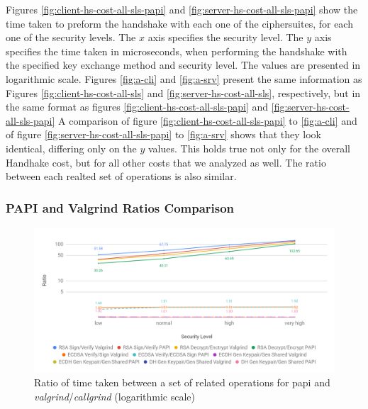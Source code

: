Figures \ref{fig:client-hs-cost-all-sls-papi} and \ref{fig:server-hs-cost-all-sls-papi} show the time taken to preform the handshake with each one
of the ciphersuites, for each one of the security levels. The $x$ axis specifies the security level. The $y$ axis specifies the time taken in microseconds,
when performing the handshake with the specified key exchange method and security level. The values are presented in logarithmic scale. 
Figures \ref{fig:a-cli} and \ref{fig:a-srv} present the same information as Figures \ref{fig:client-hs-cost-all-sls} and \ref{fig:server-hs-cost-all-sls}, respectively,
but in the same format as figures \ref{fig:client-hs-cost-all-sls-papi} and \ref{fig:server-hs-cost-all-sls-papi}
A comparison of figure \ref{fig:client-hs-cost-all-sls-papi} to \ref{fig:a-cli} and of figure \ref{fig:server-hs-cost-all-sls-papi} to \ref{fig:a-srv} 
shows that they look identical, differing only on the $y$ values. This holds true not only for the overall Handhake cost, but for all other 
costs that we analyzed as well. The ratio between each realted set of operations is also similar.

\subsubsection{PAPI and Valgrind Ratios Comparison} \label{sec:papi-valgrind-ratios}

\begin{figure}
  \centering
  \includegraphics[width=1.0\textwidth]{img/chart-23.png}
  \centering \caption{\label{fig:papi-operations-ratio}Ratio of time taken between a set of related operations for \gls{papi} and \textit{valgrind}/\textit{callgrind} (logarithmic scale)}
\end{figure}

